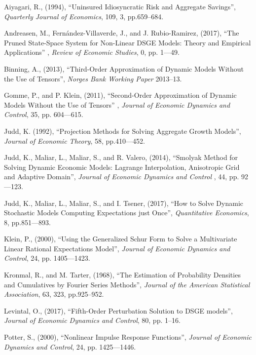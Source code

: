 \documentclass[notitlepage,11pt]{article}
\begin{document}
\begin{thebibliography}{99}
\bibitem{} Aiyagari, R., (1994), \textquotedblleft Uninsured Idiosyncratic
Risk and Aggregate Savings\textquotedblright , \textit{Quarterly Journal of
Economics}, 109, 3, pp.659--684.

\bibitem{} Andreasen, M., Fern\'{a}ndez-Villaverde, J., and J.
Rubio-Ramirez, (2017), \textquotedblleft The Pruned State-Space System for
Non-Linear DSGE Models: Theory and Empirical Applications\textquotedblright
, \textit{Review of Economic Studies}, 0, pp. 1---49.

\bibitem{} Binning, A., (2013), \textquotedblleft Third-Order Approximation
of Dynamic Models Without the Use of Tensors\textquotedblright , \textit{%
Norges Bank Working Paper} 2013--13.

\bibitem{} Gomme, P., and P. Klein, (2011), \textquotedblleft Second-Order
Approximation of Dynamic Models Without the Use of Tensors\textquotedblright
, \textit{Journal of Economic Dynamics and Control}, 35, pp. 604---615.

\bibitem{} Judd, K. (1992), \textquotedblleft Projection Methods for Solving
Aggregate Growth Models\textquotedblright , \textit{Journal of Economic
Theory}, 58, pp.410---452.

\bibitem{} Judd, K., Maliar, L., Maliar, S., and R. Valero, (2014),
\textquotedblleft Smolyak Method for Solving Dynamic Economic Models:
Lagrange Interpolation, Anisotropic Grid and Adaptive
Domain\textquotedblright , \textit{Journal of Economic Dynamics and Control}%
, 44, pp. 92---123.

\bibitem{} Judd, K., Maliar, L., Maliar, S., and I. Tsener, (2017),
\textquotedblleft How to Solve Dynamic Stochastic Models Computing
Expectations just Once\textquotedblright , \textit{Quantitative Economics},
8, pp.851---893.

\bibitem{} Klein, P., (2000), \textquotedblleft Using the Generalized Schur
Form to Solve a Multivariate Linear Rational Expectations
Model\textquotedblright , \textit{Journal of Economic Dynamics and Control},
24, pp. 1405---1423.

\bibitem{} Kronmal, R., and M. Tarter, (1968), \textquotedblleft The
Estimation of Probability Densities and Cumulatives by Fourier Series
Methods\textquotedblright , \textit{Journal of the American Statistical
Association}, 63, 323, pp.925--952.

\bibitem{} Levintal, O., (2017), \textquotedblleft Fifth-Order Perturbation
Solution to DSGE models\textquotedblright , \textit{Journal of Economic
Dynamics and Control}, 80, pp. 1--16.

\bibitem{} Potter, S., (2000), \textquotedblleft Nonlinear Impulse Response
Functions\textquotedblright , \textit{Journal of Economic Dynamics and
Control}, 24, pp. 1425---1446.
\end{thebibliography}
\end{document}
